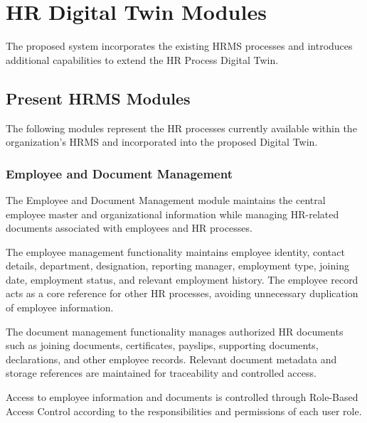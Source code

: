 \documentclass[12pt,a4paper]{article}
\begin{document}

\section{HR Digital Twin Modules}

The proposed system incorporates the existing HRMS processes and
introduces additional capabilities to extend the HR Process Digital
Twin.


\subsection{Present HRMS Modules}

The following modules represent the HR processes currently
available within the organization's HRMS and incorporated into the
proposed Digital Twin.

\subsubsection{Employee and Document Management}

The Employee and Document Management module maintains the central
employee master and organizational information while managing
HR-related documents associated with employees and HR processes.

The employee management functionality maintains employee identity,
contact details, department, designation, reporting manager,
employment type, joining date, employment status, and relevant
employment history. The employee record acts as a core reference
for other HR processes, avoiding unnecessary duplication of
employee information.

The document management functionality manages authorized HR
documents such as joining documents, certificates, payslips,
supporting documents, declarations, and other employee records.
Relevant document metadata and storage references are maintained
for traceability and controlled access.

Access to employee information and documents is controlled through
Role-Based Access Control according to the responsibilities and
permissions of each user role.
\end{document}
